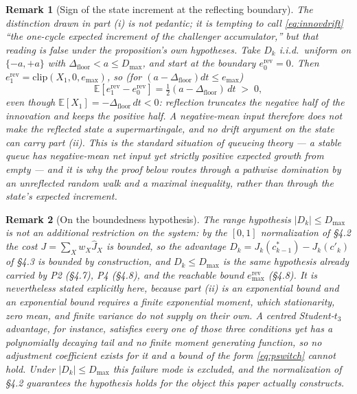 \documentclass[11pt]{article}
\newtheorem{remark}{Remark}
\newcommand{\Dfloor}{\Delta_{\text{floor}}}
\newcommand{\Erev}{e^{\text{rev}}}
\newcommand{\Eremax}{e^{\text{rev}}_{\max}}
\begin{document}
\begin{remark}[Sign of the state increment at the reflecting boundary] \label{rem:boundarydrift}
The distinction drawn in part (i) is not pedantic; it is tempting to call \eqref{eq:innovdrift} ``the one-cycle expected increment of the challenger accumulator,'' but that reading is false under the proposition's own hypotheses. Take $D_k$ i.i.d.\ uniform on $\{-a, +a\}$ with $\Dfloor < a \le D_{\max}$, and start at the boundary $\Erev_0 = 0$. Then $\Erev_1 = \mathrm{clip}(X_1, 0, e_{\max})$, so (for $(a-\Dfloor)dt \le e_{\max}$)
\begin{equation}
\mathbb{E}[\Erev_1 - \Erev_0] = \tfrac{1}{2}(a - \Dfloor)\,dt \;>\; 0,
\end{equation}
even though $\mathbb{E}[X_1] = -\Dfloor\,dt < 0$: reflection truncates the negative half of the innovation and keeps the positive half. A negative-mean input therefore does \emph{not} make the reflected state a supermartingale, and no drift argument on the state can carry part (ii). This is the standard situation of queueing theory --- a stable queue has negative-mean net input yet strictly positive expected growth from empty --- and it is why the proof below routes through a pathwise domination by an unreflected random walk and a maximal inequality, rather than through the state's expected increment.
\end{remark}

\begin{remark}[On the boundedness hypothesis]
The range hypothesis $|D_k| \le D_{\max}$ is not an additional restriction on the system: by the $[0,1]$ normalization of \S4.2 the cost $J = \sum_X w_X \hat J_X$ is bounded, so the advantage $D_k = J_k(c^*_{k-1}) - J_k(c'_k)$ of \S4.3 is bounded by construction, and $D_k \le D_{\max}$ is the same hypothesis already carried by P2 (\S4.7), P4 (\S4.8), and the reachable bound $\Eremax$ (\S4.8). It is nevertheless stated \emph{explicitly} here, because part (ii) is an exponential bound and an exponential bound requires a finite exponential moment, which stationarity, zero mean, and finite variance do not supply on their own. A centred Student-$t_3$ advantage, for instance, satisfies every one of those three conditions yet has a polynomially decaying tail and no finite moment generating function, so no adjustment coefficient exists for it and a bound of the form \eqref{eq:pswitch} cannot hold. Under $|D_k| \le D_{\max}$ this failure mode is excluded, and the normalization of \S4.2 guarantees the hypothesis holds for the object this paper actually constructs.
\end{remark}
\end{document}
